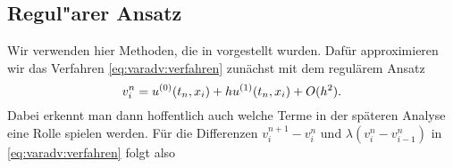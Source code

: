 \hspace{-1cm}

\subsection{Regul"arer Ansatz}

Wir verwenden hier Methoden, die in \cite{Junk2004} vorgestellt wurden.
Dafür approximieren wir das Verfahren \eqref{eq:varadv:verfahren} zunächst mit dem regulärem Ansatz
\[ v^n_i = u^{(0)}(t_n, x_i) + h u^{(1)}(t_n, x_i) + O(h^2). \]
Dabei erkennt man dann hoffentlich auch welche Terme in der späteren Analyse eine Rolle spielen werden.
Für die Differenzen $v^{n+1}_i - v^n_i$ und $\lambda( v^n_i - v^n_{i-1} )$ in \eqref{eq:varadv:verfahren} folgt also

